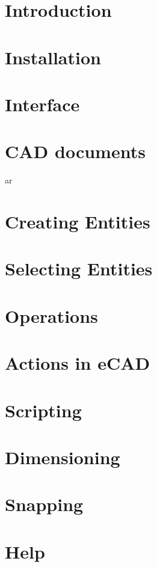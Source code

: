\documentclass[12pt]{article}
\begin{document}
\begin{screen}
\ppttitle
\end{screen}
\footskip 0.7cm
\newpage


\newpage
\section{Introduction}

\newpage
\section{Installation}

\newpage
\section{Interface}

\newpage
\section{CAD documents}
ar
\newpage
\section{Creating Entities}

\newpage
\section{Selecting Entities}

\newpage
\section{Operations}

\newpage
\section{Actions in eCAD}

\newpage
\section{Scripting}

\newpage
\section{Dimensioning}

\newpage
\section{Snapping}

\newpage
\section{Help}

\end{document}
